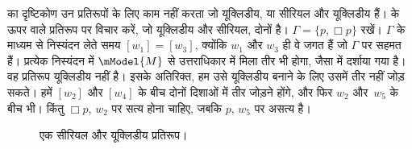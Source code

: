 \documentclass[../../../include/open-logic-section]{subfiles}
\begin{document}


 का दृष्टिकोण उन प्रतिरूपों के लिए काम नहीं करता जो
यूक्लिडीय, या सीरियल और यूक्लिडीय हैं।  के ऊपर वाले
प्रतिरूप पर विचार करें, जो यूक्लिडीय और सीरियल, दोनों है। $\Gamma = \{p,
\Box p \}$ रखें। $\Gamma$ के माध्यम से निस्यंदन लेते समय $[w_1] =
[w_3]$, क्योंकि $w_1$ और $w_3$ ही वे जगत हैं जो $\Gamma$ पर सहमत हैं।
प्रत्येक निस्यंदन में $\mModel{M}$ से उत्तराधिकार में मिला तीर भी होगा,
जैसा  में दर्शाया गया है। वह प्रतिरूप यूक्लिडीय नहीं
है। इसके अतिरिक्त, हम उसे यूक्लिडीय बनाने के लिए उसमें तीर नहीं जोड़ सकते।
हमें $[w_2]$ और $[w_4]$ के बीच दोनों दिशाओं में तीर जोड़ने होंगे, और फिर
$w_2$ और~$w_5$ के बीच भी। किंतु $\Box p$, $w_2$ पर सत्य होना चाहिए,
जबकि $p$, $w_5$ पर असत्य है।

\begin{figure}[htpb]
  \centering
  \caption{एक सीरियल और यूक्लिडीय प्रतिरूप।}
\end{figure}
\end{document}
